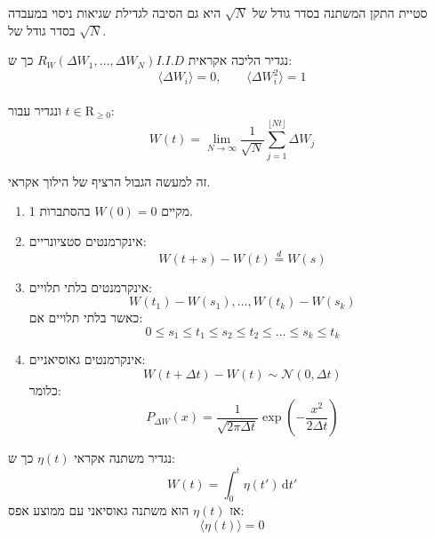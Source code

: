 \documentclass{tstextbook}
\begin{document}
\begin{remark}
סטיית התקן המשתנה בסדר גודל של \(\sqrt{N}\) היא גם הסיבה לגדילת שגיאות ניסוי במעבדה בסדר גודל של \(\sqrt{ N }\).

\end{remark}
\begin{definition}
נגדיר הליכה אקראית \(I.I.D\)\(R_W(\Delta W_1, \dots, \Delta W_N)\) כך ש:\\
$$\langle \Delta W_i \rangle = 0, \qquad \langle \Delta W_i^2 \rangle = 1$$\\

ונגדיר עבור \(t \in \mathrm{R}_{\geq 0}\):\\
$$W(t) = \lim_{N \to \infty} \frac{1}{\sqrt{N}} \sum_{j=1}^{\lfloor Nt \rfloor} \Delta W_j$$

\end{definition}
\begin{remark}
זה למעשה הגבול הרציף של הילוך אקראי.

\end{remark}
\begin{proposition}
  \begin{enumerate}
    \item מקיים \(W(0) = 0\) בהסתברות 1. 


    \item אינקרמנטים סטציונריים:  \\
$$W(t+s)-W(t) \overset{d}{=} W(s)$$


    \item אינקרמנטים בלתי תלויים: \\
$$W(t_1)-W(s_1), \dots, W(t_k)-W(s_k)$$
כאשר בלתי תלויים אם:
$$0 \leq s_1 \leq t_1 \leq s_2 \leq t_2 \leq \dots \leq s_k \leq t_k$$


    \item אינקרמנטים גאוסיאניים: \\
$$W(t+\Delta t) - W(t) \sim \mathcal{N}(0, \Delta t)$$
כלומר:\\
$$P_{\Delta W}(x) = \frac{1}{\sqrt{2\pi \Delta t}} \exp\left( -\frac{x^2}{2\Delta t} \right)$$


  \end{enumerate}
\end{proposition}
\begin{definition}
נגדיר משתנה אקראי \(\eta(t)\) כך ש:\\
$$W(t) = \int_0^t \eta(t') \,\mathrm{d}t'$$
אז \(\eta(t)\) הוא משתנה גאוסיאני עם ממוצע אפס:
$$\langle \eta(t) \rangle = 0$$

\end{definition}
\end{document}
